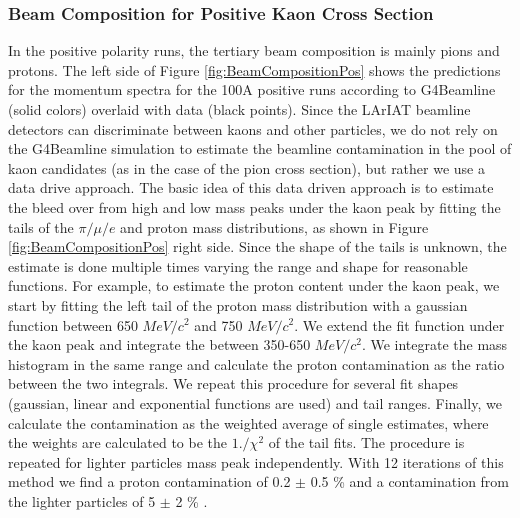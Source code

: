 \subsubsection{Beam Composition for Positive Kaon Cross Section}
In the positive polarity runs, the tertiary beam composition is mainly pions and protons. The left side of Figure \ref{fig:BeamCompositionPos} shows the  predictions for the momentum spectra for the 100A positive runs  according to  G4Beamline (solid colors) overlaid with data (black points). 
Since the LArIAT beamline detectors can discriminate between kaons and other particles, we do not rely on the G4Beamline simulation to estimate the beamline contamination in the pool of kaon candidates (as in the case of the pion cross section), but rather we use a data drive approach. 
The basic idea of this data driven approach is to estimate the bleed over from high and low mass peaks under the kaon peak by fitting the tails of the $\pi/\mu/e$ and proton mass distributions, as shown in Figure \ref{fig:BeamCompositionPos} right side. 
Since the shape of the tails is unknown, the estimate is done multiple times varying the range and shape for reasonable functions. 
For example, to estimate the proton content under the kaon peak, we start by fitting the left tail of the proton mass distribution with a gaussian function between 650 $MeV/c^2$ and 750 $MeV/c^2$.%
We extend the fit function under the kaon peak and integrate the between 350-650 $MeV/c^2$. We integrate the mass histogram in the same range and calculate the proton contamination as the ratio between the two integrals. We repeat this procedure for several fit shapes (gaussian, linear and exponential functions are used) and tail ranges. Finally, we calculate the contamination as the weighted average of single estimates, where the weights are calculated to be the $1./\chi^2$ of the tail fits. The procedure is repeated for lighter particles mass peak independently.
With 12 iterations of this method we find a proton contamination of  0.2 $\pm$ 0.5 \%  and a contamination from the lighter particles of 5 $\pm$ 2 \% .



